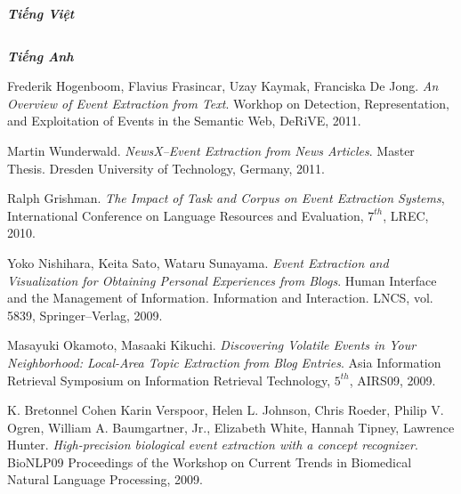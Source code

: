\begin{thebibliography}{99}


\begin{flushright}
	{\Large\bf\emph{Tiếng Việt}}
\end{flushright}
$\;$	
\begin{flushright}
{\Large\bf\emph{Tiếng Anh}}
\end{flushright}
		 Frederik Hogenboom, Flavius Frasincar, Uzay Kaymak, Franciska De Jong. \emph{An Overview of Event Extraction from Text}. Workhop on Detection, Representation, and Exploitation of Events in the Semantic Web, DeRiVE, 2011.

		 Martin Wunderwald. \emph{NewsX--Event Extraction from News Articles}. Master Thesis. Dresden University of Technology, Germany, 2011.
	
		
		 Ralph Grishman.  \emph{The Impact of Task and Corpus on Event Extraction Systems}, International Conference on Language Resources and Evaluation, $7^{th}$, LREC, 2010. 

		 Yoko Nishihara, Keita Sato, Wataru Sunayama. \emph{Event Extraction and Visualization for Obtaining Personal Experiences from Blogs}. Human Interface and the Management of Information. Information and Interaction. LNCS, vol. 5839, Springer--Verlag, 2009.
		
		 	Masayuki Okamoto, Masaaki Kikuchi. \emph{Discovering Volatile Events in Your Neighborhood: Local-Area Topic Extraction from Blog Entries}. Asia Information Retrieval Symposium on Information Retrieval Technology, $5^{th}$, AIRS09, 2009.

		 K. Bretonnel Cohen 	
	Karin Verspoor, 
	Helen L. Johnson, 
	Chris Roeder, 	
	Philip V. Ogren, 	
	William A. Baumgartner, Jr.,
	Elizabeth White, 	
	Hannah Tipney, 	
	Lawrence Hunter.	 \emph{High-precision biological event extraction with a concept recognizer}. BioNLP09 Proceedings of the Workshop on Current Trends in Biomedical Natural Language Processing, 2009.
	


\end{thebibliography}
